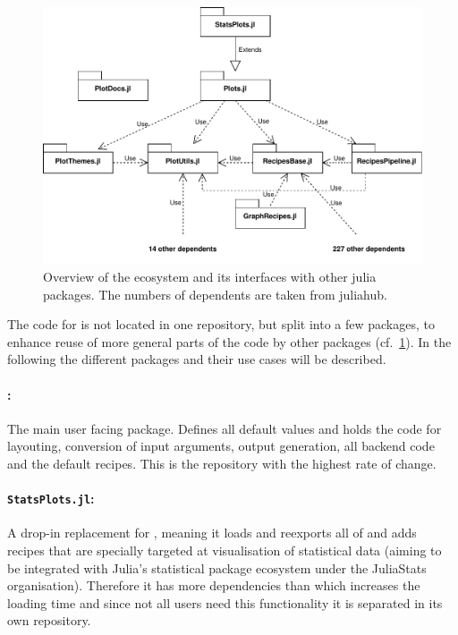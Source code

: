 \documentclass[a4paper]{article}
\begin{document}
\begin{figure}[H]
    \centering
    \includegraphics[width=\textwidth]{./fig/Ecosystem.pdf}
    \caption{
        Overview of the \Plots ecosystem and its interfaces with other julia packages.
        The numbers of dependents are taken from juliahub\cite{PlotsJuliaHub}.
    }
    \label{fig:ecosystem}
\end{figure}

The code for \Plots is not located in one repository, but split into a few packages, to enhance reuse of more general parts of the code by other packages (cf.~\cref{fig:ecosystem}).
In the following the different packages and their use cases will be described.

\paragraph{\Plots:} The main user facing package.
Defines all default values and holds the code for layouting, conversion of input arguments, output generation, all backend code and the default recipes.
This is the repository with the highest rate of change.

\paragraph{\texttt{StatsPlots.jl}:} A drop-in replacement for \Plots, meaning it loads and reexports all of \Plots and adds recipes that are specially targeted at visualisation of statistical data (aiming to be integrated with Julia's statistical package ecosystem under the JuliaStats organisation).
Therefore it has more dependencies than \Plots which increases the loading time and since not all users need this functionality it is separated in its own repository.
\end{document}
